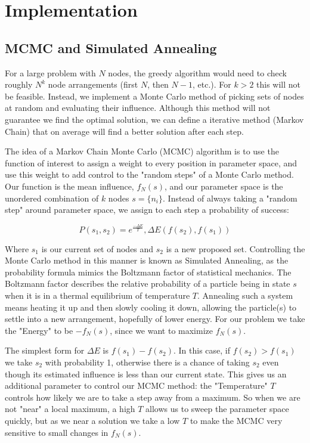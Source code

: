 \documentclass{article}
\begin{document}
	\section{Implementation}
	
	\subsection{MCMC and Simulated Annealing}
	For a large problem with $N$ nodes, the greedy algorithm would need to check roughly $N^k$ node arrangements (first $N$, then $N-1$, etc.). For $k > 2$ this will not be feasible. Instead, we implement a Monte Carlo method of picking sets of nodes at random and evaluating their influence. Although this method will not guarantee we find the optimal solution, we can define a iterative method (Markov Chain) that on average will find a better solution after each step.
		
	The idea of a Markov Chain Monte Carlo (MCMC) algorithm is to use the function of interest to assign a weight to every position in parameter space, and use this weight to add control to the "random steps" of a Monte Carlo method. Our function is the mean influence, $f_N(s)$, and our parameter space is the unordered combination of $k$ nodes $s = \{n_i\}$. Instead of always taking a "random step" around parameter space, we assign to each step a probability of success:
		
		\begin{equation}
		\boxed{
			P(s_1,s_2) = e^\frac{-\Delta E}{T}, \Delta E(f(s_2),f(s_1))
		}
		\end{equation}
		
		Where $s_1$ is our current set of nodes and $s_2$ is a new proposed set. Controlling the Monte Carlo method in this manner is known as Simulated Annealing, as the probability formula mimics the Boltzmann factor of statistical mechanics. The Boltzmann factor describes the relative probability of a particle being in state $s$ when it is in a thermal equilibrium of temperature $T$. Annealing such a system means heating it up and then slowly cooling it down, allowing the particle(s) to settle into a new arrangement, hopefully of lower energy. For our problem we take the "Energy" to be $-f_N(s)$, since we want to maximize $f_N(s)$. 
		
		The simplest form for $\Delta E$ is $f(s_1) - f(s_2)$. In this case, if $f(s_2) > f(s_1)$ we take $s_2$ with probability 1, otherwise there is a chance of taking $s_2$ even though its estimated influence is less than our current state. This gives us an additional parameter to control our MCMC method: the "Temperature" $T$ controls how likely we are to take a step away from a maximum. So when we are not "near" a local maximum, a high $T$ allows us to sweep the parameter space quickly, but as we near a solution we take a low $T$ to make the MCMC very sensitive to small changes in $f_N(s)$.
	
\end{document}
